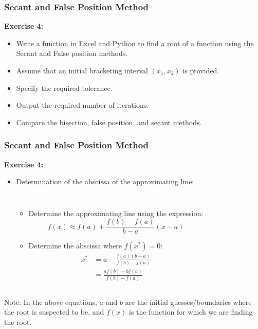 \begin{frame}[fragile]
  \frametitle{Secant and False Position Method}

  \textbf{Exercise 4:}
  \begin{itemize}
    \item Write a function in Excel and Python to find a root of a function using the Secant and False position methods.
    \item Assume that an initial bracketing interval \((x_1, x_2)\) is provided.
    \item Specify the required tolerance.
    \item Output the required number of iterations.
    \item Compare the bisection, false position, and secant methods.
  \end{itemize}
\end{frame}

\begin{frame}[fragile]
  \frametitle{Secant and False Position Method}

  \textbf{Exercise 4:}
  \begin{itemize}
    \item Determination of the abscissa of the approximating line:
    \begin{columns}
    \begin{itemize}
      \item Determine the approximating line using the expression:
      \[
      f(x) \approx f(a) + \frac{f(b) - f(a)}{b - a}(x - a)
      \]
      \item Determine the abscissa where \(f(x^*) = 0\):
        \begin{align*}
          x^* &= a - \frac{f(a)(b - a)}{f(b) - f(a)}\\
              &= \frac{af(b) - bf(a)}{f(b) - f(a)}
        \end{align*}
      \end{itemize}
        \vspace{0.5cm}
        
      \end{columns}
  \end{itemize}
  Note: In the above equations, \(a\) and \(b\) are the initial guesses/boundaries where the root is suspected to be, and \(f(x)\) is the function for which we are finding the root.
\end{frame}


